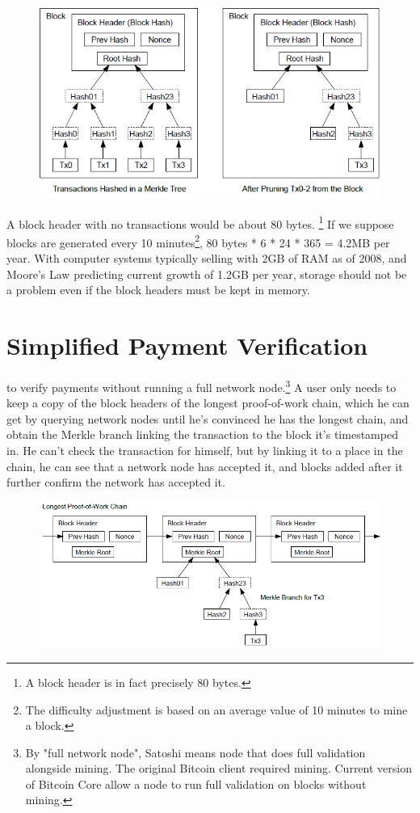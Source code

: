 \documentclass[nohyper]{tufte-handout}
\begin{document}
\begin{figure}[!h]
\centering
\includegraphics[width=0.75\linewidth]{reclaiming-disk.png}
\end{figure}

A block header with no transactions would be about 80 bytes.  \footnote{A block header is in fact precisely 80 bytes.} If we
suppose blocks are generated every 10 minutes\footnote{The difficulty adjustment is based on an average value of 10 minutes to mine a block.}, 80 bytes * 6 * 24 * 365 =
4.2MB per year. With computer systems typically selling with 2GB of RAM
as of 2008, and Moore's Law predicting current growth of 1.2GB per year,
storage should not be a problem even if the block headers must be kept
in memory.


\section{Simplified Payment
Verification}\label{simplified-payment-verification}

 to verify payments without running a full network node.\footnote{By "full network node", Satoshi means node that does full validation alongside mining.  The original Bitcoin client required mining.  Current version of Bitcoin Core allow a node to run full validation on blocks without mining.} A user only needs to keep a copy of the block headers of the longest
proof-of-work chain, which he can get by querying network nodes until
he's convinced he has the longest chain, and obtain the Merkle branch
linking the transaction to the block it's timestamped in. He can't check
the transaction for himself, but by linking it to a place in the chain,
he can see that a network node has accepted it, and blocks added after
it further confirm the network has accepted it.

\begin{figure}[!h]
\centering
\includegraphics[width=\linewidth]{spv.png}

\end{figure}
\end{document}
